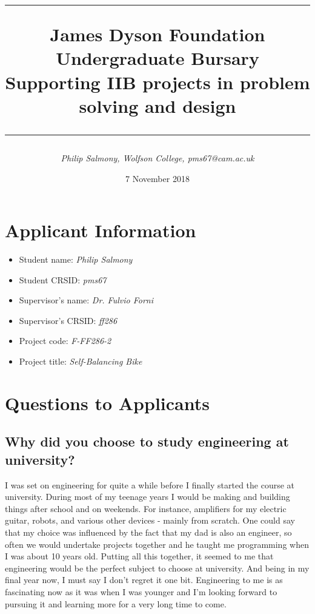 \documentclass[]{article}
\begin{document}
\title{\hrule \vspace{0.3cm} \textbf{James Dyson Foundation Undergraduate Bursary} \\ \large{Supporting IIB projects in problem solving and design} \vspace{0.2cm} \hrule }
\author{\textit{Philip Salmony, Wolfson College, pms67@cam.ac.uk}}
\date{7 November 2018}
\maketitle

\section{Applicant Information}
\begin{itemize}
\item Student name: \textit{Philip Salmony}
\item Student CRSID: \textit{pms67}
\item Supervisor's name: \textit{Dr. Fulvio Forni}
\item Supervisor's CRSID: \textit{ff286}
\item Project code: \textit{F-FF286-2}
\item Project title: \textit{Self-Balancing Bike}
\end{itemize}

\section{Questions to Applicants}

\subsection{Why did you choose to study engineering at university?}

I was set on engineering for quite a while before I finally started the course at university. During most of my teenage years I would be making and building things after school and on weekends. For instance, amplifiers for my electric guitar, robots, and various other devices - mainly from scratch. One could say that my choice was influenced by the fact that my dad is also an engineer, so often we would undertake projects together and he taught me programming when I was about 10 years old. Putting all this together, it seemed to me that engineering would be the perfect subject to choose at university. And being in my final year now, I must say I don't regret it one bit. Engineering to me is as fascinating now as it was when I was younger and I'm looking forward to pursuing it and learning more for a very long time to come.
\end{document}

